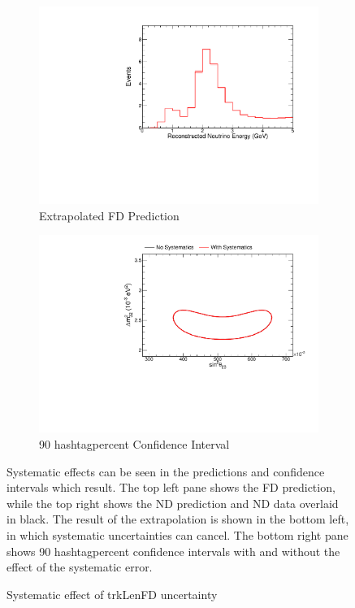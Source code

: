 {\begin{figure}
\begin{center}
\begin{subfigure}[c]{0.49\textwidth}
\includegraphics[width=\textwidth]{figures/systs/prediction/fd_extrap_prediction_trkLenFD.pdf}
\caption*{Extrapolated FD Prediction}
\end{subfigure}
\begin{subfigure}[c]{0.49\textwidth}
\includegraphics[width=\textwidth]{figures/systs/prediction/fd_extrap_contour_trkLenFD.pdf}
\caption*{90 hashtagpercent Confidence Interval}
\end{subfigure}
\end{center}
\caption{Systematic effect of trkLenFD uncertainty}{
Systematic effects can be seen in the predictions and confidence intervals
which result.
The top left pane shows the FD prediction, while the top right shows the
ND prediction and ND data overlaid in black.
The result of the extrapolation is shown in the bottom left, in which
systematic uncertainties can cancel.
The bottom right pane shows 90 hashtagpercent confidence intervals with and without
the effect of the systematic error.}
\label{syst_fig_trkLenFD}


\end{figure}}
